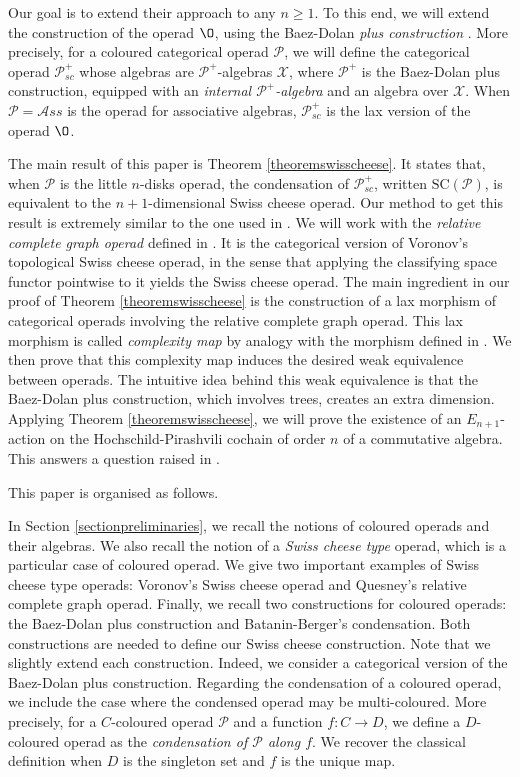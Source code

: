 \documentclass[]{amsart}
\theoremstyle{definition}
\begin{document}
Our goal is to extend their approach to any $n \geq 1$. To this end, we will extend the construction of the operad $\O$, using the Baez-Dolan \emph{plus construction} \cite{baezdolan}. More precisely, for a coloured categorical operad $\mathcal{P}$, we will define the categorical operad $\mathcal{P}_{sc}^+$ whose algebras are $\mathcal{P}^+$-algebras $\mathcal{X}$, where $\mathcal{P}^+$ is the Baez-Dolan plus construction, equipped with an \emph{internal $\mathcal{P}^+$-algebra} \cite[Definition 7.2]{batanin} and an algebra over $\mathcal{X}$. When $\mathcal{P}=\mathcal{A}ss$ is the operad for associative algebras, $\mathcal{P}^+_{sc}$ is the lax version of the operad $\O$.

The main result of this paper is Theorem \ref{theoremswisscheese}. It states that, when $\mathcal{P}$ is the little $n$-disks operad, the condensation of $\mathcal{P}_{sc}^+$, written $\mathrm{SC}(\mathcal{P})$, is equivalent to the $n+1$-dimensional Swiss cheese operad. Our method to get this result is extremely similar to the one used in \cite{BataninBergerLattice}. We will work with the \emph{relative complete graph operad} defined in \cite[Section 3.2]{quesney}. It is the categorical version of Voronov's topological Swiss cheese operad, in the sense that applying the classifying space functor pointwise to it yields the Swiss cheese operad. The main ingredient in our proof of Theorem \ref{theoremswisscheese} is the construction of a lax morphism of categorical operads involving the relative complete graph operad. This lax morphism is called \emph{complexity map} by analogy with the morphism defined in \cite[Proposition 3.4]{BataninBergerLattice}. We then prove that this complexity map induces the desired weak equivalence between operads. The intuitive idea behind this weak equivalence is that the Baez-Dolan plus construction, which involves trees, creates an extra dimension. Applying Theorem \ref{theoremswisscheese}, we will prove the existence of an $E_{n+1}$-action on the Hochschild-Pirashvili cochain of order $n$ of a commutative algebra. This answers a question raised in \cite[Remark 2.19]{BataninBergerLattice}.

This paper is organised as follows.

In Section \ref{sectionpreliminaries}, we recall the notions of coloured operads and their algebras. We also recall the notion of a \emph{Swiss cheese type} operad, which is a particular case of coloured operad. We give two important examples of Swiss cheese type operads: Voronov's Swiss cheese operad and Quesney's relative complete graph operad. Finally, we recall two constructions for coloured operads: the Baez-Dolan plus construction and Batanin-Berger's condensation. Both constructions are needed to define our Swiss cheese construction. Note that we slightly extend each construction. Indeed, we consider a categorical version of the Baez-Dolan plus construction. Regarding the condensation of a coloured operad, we include the case where the condensed operad may be multi-coloured. More precisely, for a $C$-coloured operad $\mathcal{P}$ and a function $f: C \to D$, we define a $D$-coloured operad as the \emph{condensation of $\mathcal{P}$ along $f$}. We recover the classical definition when $D$ is the singleton set and $f$ is the unique map.
\end{document}
